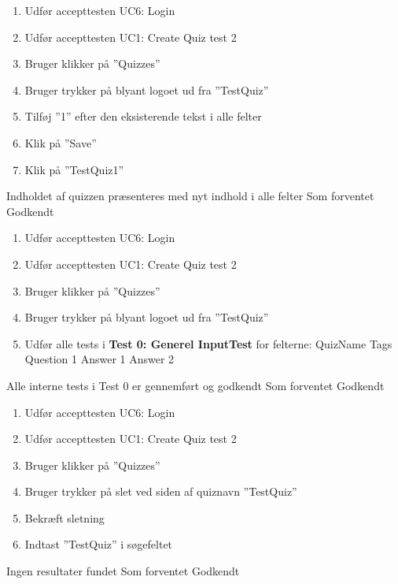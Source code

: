 
		{
		\begin{enumerate}
			\item Udfør accepttesten UC6: Login
			\item Udfør accepttesten UC1: Create Quiz test 2
			\item Bruger klikker på ''Quizzes''
			\item Bruger trykker på blyant logoet ud fra ''TestQuiz''
			\item Tilføj ''1'' efter den eksisterende tekst i alle felter
			\item Klik på ''Save''
			\item Klik på ''TestQuiz1''
		\end{enumerate}
		} %
		{Indholdet af quizzen præsenteres med nyt indhold i alle felter} %
		{ Som forventet }{ Godkendt }

		{
		\begin{enumerate}
			\item Udfør accepttesten UC6: Login
			\item Udfør accepttesten UC1: Create Quiz test 2
			\item Bruger klikker på ''Quizzes''
			\item Bruger trykker på blyant logoet ud fra ''TestQuiz''
			\item Udfør alle tests i \textbf{Test 0: Generel InputTest} for felterne:
				\subitem QuizName
				\subitem Tags
				\subitem Question 1
				\subitem Answer 1
				\subitem Answer 2
		\end{enumerate}
		} %
		{Alle interne tests i Test 0 er gennemført og godkendt} %
		{ Som forventet }{ Godkendt }

		{
		\begin{enumerate}
			\item Udfør accepttesten UC6: Login
			\item Udfør accepttesten UC1: Create Quiz test 2
			\item Bruger klikker på ''Quizzes''
			\item Bruger trykker på slet ved siden af quiznavn ''TestQuiz''
			\item Bekræft sletning
			\item Indtast ''TestQuiz'' i søgefeltet
		\end{enumerate}
		} %
		{Ingen resultater fundet} %
		{ Som forventet }{ Godkendt }

